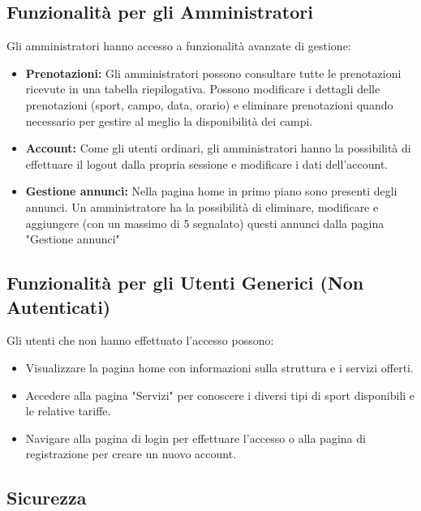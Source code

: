 \documentclass{article}
\begin{document}
\subsection{Funzionalità per gli Amministratori}

Gli amministratori hanno accesso a funzionalità avanzate di gestione:

\begin{itemize}
    \item \textbf{Prenotazioni:} Gli amministratori possono consultare tutte le prenotazioni ricevute in una tabella riepilogativa. Possono modificare i dettagli delle prenotazioni (sport, campo, data, orario) e eliminare prenotazioni quando necessario per gestire al meglio la disponibilità dei campi.
    
    \item \textbf{Account:} Come gli utenti ordinari, gli amministratori hanno la possibilità di effettuare il logout dalla propria sessione e modificare i dati dell'account.

    \item \textbf{Gestione annunci:} Nella pagina home in primo piano sono presenti degli annunci. Un amministratore ha la possibilità di eliminare, modificare e aggiungere (con un massimo di 5 segnalato) questi annunci dalla pagina "Gestione annunci"

\end{itemize}

\subsection{Funzionalità per gli Utenti Generici (Non Autenticati)}

Gli utenti che non hanno effettuato l'accesso possono:

\begin{itemize}
    \item Visualizzare la pagina home con informazioni sulla struttura e i servizi offerti.
    
    \item Accedere alla pagina "Servizi" per conoscere i diversi tipi di sport disponibili e le relative tariffe.
    
    \item Navigare alla pagina di login per effettuare l'accesso o alla pagina di registrazione per creare un nuovo account.
\end{itemize}


\subsection{Sicurezza}
\end{document}
